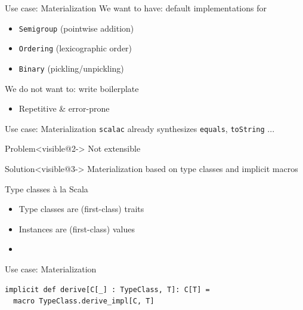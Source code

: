 \documentclass[compress,xcolor={usenames,dvipsnames,table}]{beamer}
\begin{document}
\begin{frame}{Use case: Materialization}
  We want to have: default implementations for
  \begin{itemize}
    \item \texttt{Semigroup} (pointwise addition)
    \item \texttt{Ordering} (lexicographic order)
    \item \texttt{Binary} (pickling/unpickling)
  \end{itemize}

  \vspace{1em}
  We do not want to: write boilerplate
  \begin{itemize}
    \item Repetitive \& error-prone
  \end{itemize}
\end{frame}

\begin{frame}{Use case: Materialization}
  \texttt{scalac} already synthesizes \texttt{equals}, \texttt{toString} ...

  \vspace{1em}
  \begin{alertblock}{Problem}<visible@2->
    Not extensible
  \end{alertblock}

  \vspace{1em}
  \begin{exampleblock}{Solution}<visible@3->
    Materialization based on type classes and implicit macros
  \end{exampleblock}
\end{frame}

\begin{frame}{Type classes à la Scala}
  \begin{itemize}
    \item Type classes are (first-class) traits
    \item Instances are (first-class) values
    \item<visible@2> \text{\color{blue}{Both can use arbitrary language features}}
  \end{itemize}
\end{frame}

\begin{frame}[fragile]{Use case: Materialization}
  \begin{verbatim}
implicit def derive[C[_] : TypeClass, T]: C[T] =
  macro TypeClass.derive_impl[C, T]
  \end{verbatim}
\end{frame}
\end{document}
